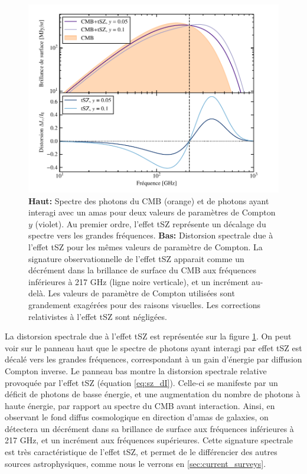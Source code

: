 \begin{figure}[t]
    \centering
    \includegraphics[width=.8\linewidth]{Figures/Chap_amas/CMB_SZ_spectrum.pdf}
    \caption{
        \textbf{Haut:} Spectre des photons du CMB (orange) et de photons ayant interagi avec un amas pour deux valeurs de paramètres de Compton $y$ (violet).
        Au premier ordre, l'effet tSZ représente un décalage du spectre vers les grandes fréquences.
        \textbf{Bas:} Distorsion spectrale due à l'effet tSZ pour les mêmes valeurs de paramètre de Compton.
        La signature observationnelle de l'effet tSZ apparait comme un décrément dans la brillance de surface du CMB aux fréquences inférieures à 217 GHz (ligne noire verticale), et un incrément au-delà.
        Les valeurs de paramètre de Compton utilisées sont grandement exagérées pour des raisons visuelles.
        Les corrections relativistes à l'effet tSZ sont négligées.
    }
    \label{fig:tsz_spec}
\end{figure}

La distorsion spectrale due à l'effet tSZ est représentée sur la figure \ref{fig:tsz_spec}.
On peut voir sur le panneau haut que le spectre de photons ayant interagi par effet tSZ est décalé vers les grandes fréquences, correspondant à un gain d'énergie par diffusion Compton inverse.
Le panneau bas montre la distorsion spectrale relative provoquée par l'effet tSZ (équation \ref{eq:sz_dI}).
Celle-ci se manifeste par un déficit de photons de basse énergie, et une augmentation du nombre de photons à haute énergie, par rapport au spectre du CMB avant interaction.
Ainsi, en observant le fond diffus cosmologique en direction d'amas de galaxies, on détectera un décrément dans sa brillance de surface aux fréquences inférieures à 217 GHz, et un incrément aux fréquences supérieures.
Cette signature spectrale est très caractéristique de l'effet tSZ, et permet de le différencier des autres sources astrophysiques, comme nous le verrons en \ref{sec:current_surveys}.

